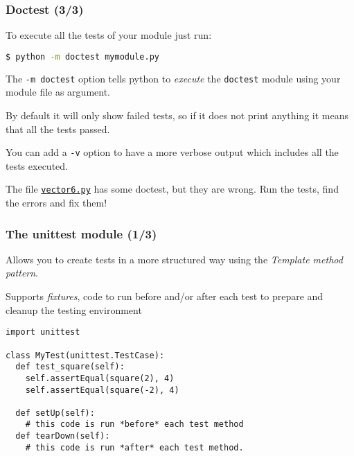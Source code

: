 \documentclass[english,serif,mathserif,xcolor=pdftex,dvipsnames,table]{beamer}
\begin{document}
\begin{frame}[fragile]
  \frametitle{Doctest (3/3)}

  To execute all the tests of your module just run: 
\+ 
\begin{lstlisting}[language=sh]
$ python -m doctest mymodule.py
  \end{lstlisting}

  \+
  The \lstinline|-m doctest| option tells python to \textit{execute} the
  \lstinline|doctest| module using your module file as argument.

  \+
  By default it will only show failed tests, so if it does not print
  anything it means that all the tests passed.

  \+
  You can add a \lstinline|-v| option to have a more verbose output
  which includes all the tests executed.






\end{frame}

\begin{frame}
\+
\begin{exercise}
  The file
  \href{http://www.gc3.uzh.ch/vector6.py}{\texttt{vector6.py}}
  has some doctest, but they are wrong. Run the tests, find the errors
  and fix them!
\end{exercise}

\end{frame}


\begin{frame}[fragile]
  \frametitle{The unittest module (1/3)}
  Allows you to create tests in a more structured way using the
  \textit{Template method pattern}.

  \+
  Supports \textit{fixtures}, code to run before and/or after each
  test to prepare and cleanup the testing environment

  \begin{lstlisting}
import unittest

class MyTest(unittest.TestCase):
  def test_square(self):
    self.assertEqual(square(2), 4)
    self.assertEqual(square(-2), 4)

  def setUp(self):
    # this code is run *before* each test method
  def tearDown(self):
    # this code is run *after* each test method.    
  \end{lstlisting}
\end{frame}
\end{document}
